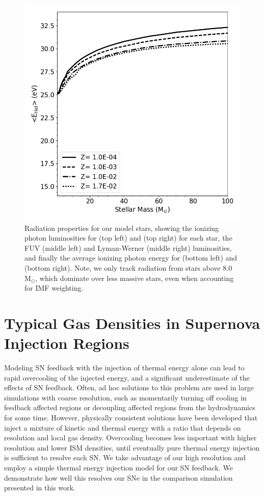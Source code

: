 \documentclass[twocolumn]{aastex61}
\newcommand{\msun}{M$_{\odot}$}
\begin{document}
\begin{figure}
\includegraphics[width=0.4\linewidth]{E1}
\caption{Radiation properties for our model stars, showing the ionizing photon luminosities for  (top left) and  (top right) for each star, the FUV (middle left) and Lyman-Werner (middle right) luminosities, and finally the average ionizing photon energy for  (bottom left) and  (bottom right). Note, we only track radiation from stars above 8.0 \msun, which dominate over less massive stars, even when accounting for IMF weighting.}
\label{fig:stellar radiation properties}
\end{figure}

\setcounter{figure}{0}
\section{Typical Gas Densities in Supernova Injection Regions}
\label{appendix:SN}

Modeling SN feedback with the injection of thermal energy alone can lead to rapid overcooling of the injected energy, and a significant underestimate of the effects of SN feedback. Often, ad hoc solutions to this problem are used in large simulations with coarse resolution, such as momentarily turning off cooling in feedback affected regions or decoupling affected regions from the hydrodynamics for some time. However, physically consistent solutions have been developed \citep[e.g][]{Simpson2016} that inject a mixture of kinetic and thermal energy with a ratio that depends on resolution and local gas density. Overcooling becomes less important with higher resolution and lower ISM densities, until eventually pure thermal energy injection is sufficient to resolve each SN. We take advantage of our high resolution and employ a simple thermal energy injection model for our SN feedback. We demonstrate how well this resolves our SNe in the comparison simulation presented in this work.
\end{document}
